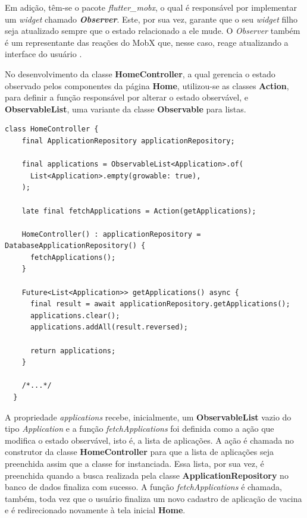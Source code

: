 Em adição, têm-se o pacote \textit{flutter\_mobx}, o qual é responsável por implementar um \textit{widget} chamado \textit{\textbf{Observer}}. Este, por sua vez, garante que o seu \textit{widget} filho seja atualizado sempre que o estado relacionado a ele mude. O \textit{Observer} também é um representante das reações do MobX que, nesse caso, reage atualizando a interface do usuário \cite{flutter-mobx-package}.

No desenvolvimento da classe \textbf{HomeController}, a qual gerencia o estado observado pelos componentes da página \textbf{Home}, utilizou-se as classes \textbf{Action}, para definir a função responsável por alterar o estado observável, e \textbf{ObservableList}, uma variante da classe \textbf{Observable} para listas.

\begin{lstlisting}[caption={Uso do \textit{MobX} na classe \textbf{HomeController}}, label={lst:home_controller_mobx}]
  class HomeController {
    final ApplicationRepository applicationRepository;

    final applications = ObservableList<Application>.of(
      List<Application>.empty(growable: true),
    );

    late final fetchApplications = Action(getApplications);

    HomeController() : applicationRepository = DatabaseApplicationRepository() {
      fetchApplications();
    }

    Future<List<Application>> getApplications() async {
      final result = await applicationRepository.getApplications();
      applications.clear();
      applications.addAll(result.reversed);

      return applications;
    }

    /*...*/
  }
\end{lstlisting}

A propriedade \textit{applications} recebe, inicialmente, um \textbf{ObservableList} vazio do tipo \textit{Application} e a função \textit{fetchApplications} foi definida como a ação que modifica o estado observável, isto é, a lista de aplicações. A ação é chamada no construtor da classe \textbf{HomeController} para que a lista de aplicações seja preenchida assim que a classe for instanciada. Essa lista, por sua vez, é preenchida quando a busca realizada pela classe \textbf{ApplicationRepository} no banco de dados finaliza com sucesso.  A função \textit{fetchApplications} é chamada, também, toda vez que o usuário finaliza um novo cadastro de aplicação de vacina e é redirecionado novamente à tela inicial \textbf{Home}.

